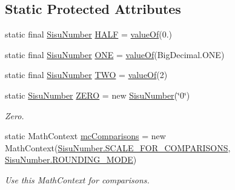 \subsection*{Static Protected Attributes}
\begin{DoxyCompactItemize}
\item 
static final \hyperlink{classcom_1_1aarrelaakso_1_1drawl_1_1_sisu_number}{Sisu\+Number} \hyperlink{classcom_1_1aarrelaakso_1_1drawl_1_1_sisu_number_afae3e6d652b8c125dccab3e110d038b0}{H\+A\+LF} = \hyperlink{classcom_1_1aarrelaakso_1_1drawl_1_1_sisu_number_abf3f63611bbeb0505b3d6217ba140f9b}{value\+Of}(0.)
\item 
static final \hyperlink{classcom_1_1aarrelaakso_1_1drawl_1_1_sisu_number}{Sisu\+Number} \hyperlink{classcom_1_1aarrelaakso_1_1drawl_1_1_sisu_number_ad74e537df980406b3282861605df259c}{O\+NE} = \hyperlink{classcom_1_1aarrelaakso_1_1drawl_1_1_sisu_number_abf3f63611bbeb0505b3d6217ba140f9b}{value\+Of}(Big\+Decimal.\+O\+NE)
\item 
static final \hyperlink{classcom_1_1aarrelaakso_1_1drawl_1_1_sisu_number}{Sisu\+Number} \hyperlink{classcom_1_1aarrelaakso_1_1drawl_1_1_sisu_number_a699eb6b7e4648b4a8d888890b32e26f9}{T\+WO} = \hyperlink{classcom_1_1aarrelaakso_1_1drawl_1_1_sisu_number_abf3f63611bbeb0505b3d6217ba140f9b}{value\+Of}(2)
\item 
static \hyperlink{classcom_1_1aarrelaakso_1_1drawl_1_1_sisu_number}{Sisu\+Number} \hyperlink{classcom_1_1aarrelaakso_1_1drawl_1_1_sisu_number_ae9e547c1510ee19d5cc6401c828f1003}{Z\+E\+RO} = new \hyperlink{classcom_1_1aarrelaakso_1_1drawl_1_1_sisu_number}{Sisu\+Number}(\char`\"{}0\char`\"{})
\begin{DoxyCompactList}\small\item\em Zero. \end{DoxyCompactList}\item 
static Math\+Context \hyperlink{classcom_1_1aarrelaakso_1_1drawl_1_1_sisu_number_a09a6e4440f1be870727ad0bc028fc237}{mc\+Comparisons} = new Math\+Context(\hyperlink{classcom_1_1aarrelaakso_1_1drawl_1_1_sisu_number_a4630f8f5414673cb5021dc7d194dc257}{Sisu\+Number.\+S\+C\+A\+L\+E\+\_\+\+F\+O\+R\+\_\+\+C\+O\+M\+P\+A\+R\+I\+S\+O\+NS}, \hyperlink{classcom_1_1aarrelaakso_1_1drawl_1_1_sisu_number_a98077c422e928740febf571e3f2ec6b5}{Sisu\+Number.\+R\+O\+U\+N\+D\+I\+N\+G\+\_\+\+M\+O\+DE})
\begin{DoxyCompactList}\small\item\em Use this Math\+Context for comparisons. \end{DoxyCompactList}\item 

\end{DoxyCompactItemize}
